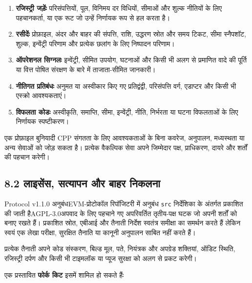 \documentclass[11pt]{article}
\begin{document}
\begin{enumerate}[leftmargin=*]
\item \textbf{रजिस्ट्री जड़ेंः} परिसंपत्तियों, पूल, विनिमय दर विधियों, सीमाओं और शुल्क नीतियों के लिए पहचानकर्ता, या एक रूट जो उन्हें निर्णायक रूप से हल करता है।
\item \textbf{रसीदेंः} प्रोफ़ाइल, अंदर और बाहर की संपत्ति, राशि, उद्धरण स्रोत और समय टिकट, सीमा स्नैपशॉट, शुल्क, इन्वेंट्री परिणाम और प्रत्येक छलांग के लिए निष्पादन परिणाम।
\item \textbf{ऑपरेशनल सिग्नलः} इन्वेंट्री, सीमित उपयोग, घटनाओं और किसी भी अलग से प्रमाणित वादे की पूर्ति या वित्त पोषित संरक्षण के बारे में ताजाता-सीमित जानकारी।
\item \textbf{नीतिगत प्रतिबंधः} अनुमत या अस्वीकार किए गए प्रतिद्वंद्वी, परिसंपत्ति वर्ग, एडाप्टर और किसी भी एस्क्रो आवश्यकताएं।
\item \textbf{विफलता कोडः} अस्वीकृति, समाप्ति, सीमा, इन्वेंट्री, नीति, निर्भरता या घटना विफलताओं के लिए निर्णायक स्पष्टीकरण।
\end{enumerate}
एक प्रोफ़ाइल बुनियादी CPP संगतता के लिए आवश्यकताओं के बिना कवरेज, अनुपालन, मध्यस्थता या अन्य सेवाओं को जोड़ सकता है। प्रत्येक वैकल्पिक सेवा अपने जिम्मेदार पक्ष, प्राधिकरण, दायरे और शर्तों की पहचान करेगी।

\subsection*{8.2 लाइसेंस, सत्यापन और बाहर निकलना}

Protocol v1.1.0 अनुबंधEVM-प्रोटोकॉल रिपॉजिटरी में अनुबंध \texttt{src} निर्देशिका के अंतर्गत प्रकाशित की जाती हैAGPL-3.0अपवाद के लिए पहचाने गए अपरिवर्तित तृतीय-पक्ष घटक जो अपनी शर्तों को बनाए रखते हैं। प्रकाशित स्रोत, एबीआई और तैनाती निर्देश स्वतंत्र समीक्षा का समर्थन करते हैं लेकिन स्वयं एक लेखा परीक्षा, सुरक्षित तैनाति या कानूनी अनुपालन साबित नहीं करते हैं।

प्रत्येक तैनाती अपने कोड संस्करण, बिल्ड मूल, पते, नियंत्रक और अपग्रेड शक्तियां, ऑडिट स्थिति, रजिस्ट्री दर्पण और किसी भी टाइमलॉक या प्यूज सुरक्षा को अलग से प्रकट करेगी।

एक प्रस्तावित \textbf{फोर्क किट} इसमें शामिल हो सकते हैंः
\end{document}
